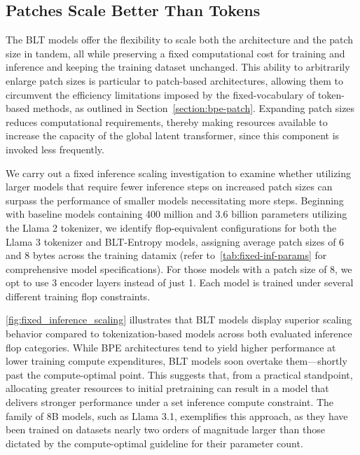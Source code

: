 \subsection{Patches Scale Better Than Tokens} The {\textsc BLT} models offer the flexibility to scale both the architecture and the patch size in tandem, all while preserving a fixed computational cost for training and inference and keeping the training dataset unchanged. This ability to arbitrarily enlarge patch sizes is particular to patch-based architectures, allowing them to circumvent the efficiency limitations imposed by the fixed-vocabulary of token-based methods, as outlined in Section~\ref{section:bpe-patch}. Expanding patch sizes reduces computational requirements, thereby making resources available to increase the capacity of the global latent transformer, since this component is invoked less frequently.

We carry out a fixed inference scaling investigation to examine whether utilizing larger models that require fewer inference steps on increased patch sizes can surpass the performance of smaller models necessitating more steps. Beginning with baseline models containing 400 million and 3.6 billion parameters utilizing the Llama 2 tokenizer, we identify flop-equivalent configurations for both the Llama 3 tokenizer and {\textsc BLT}-Entropy models, assigning average patch sizes of 6 and 8 bytes across the training datamix (refer to~\autoref{tab:fixed-inf-params} for comprehensive model specifications). For those models with a patch size of 8, we opt to use 3 encoder layers instead of just 1. Each model is trained under several different training flop constraints.

\autoref{fig:fixed_inference_scaling} illustrates that {\textsc BLT} models display superior scaling behavior compared to tokenization-based models across both evaluated inference flop categories. While BPE architectures tend to yield higher performance at lower training compute expenditures, {\textsc BLT} models soon overtake them—shortly past the compute-optimal point. This suggests that, from a practical standpoint, allocating greater resources to initial pretraining can result in a model that delivers stronger performance under a set inference compute constraint. The family of 8B models, such as Llama 3.1, exemplifies this approach, as they have been trained on datasets nearly two orders of magnitude larger than those dictated by the compute-optimal guideline for their parameter count.

